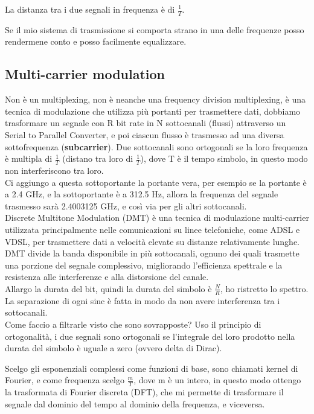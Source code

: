 La distanza tra i due segnali in frequenza è di $\frac 1 T$. 

Se il mio sistema di trasmissione si comporta strano in una delle frequenze posso rendermene conto e posso facilmente equalizzare.\\

\subsection{Multi-carrier modulation}
Non è un multiplexing, non è neanche una frequency division multiplexing, è una tecnica di modulazione che utilizza più portanti per trasmettere dati,
dobbiamo trasformare un segnale con R bit rate in N sottocanali (flussi) attraverso un Serial to Parallel Converter, e poi ciascun flusso
è trasmesso ad una diversa sottofrequenza (\textbf{subcarrier}).
Due sottocanali sono ortogonali se la loro frequenza è multipla di $\frac 1 T$ (distano tra loro di $\frac 1 T$), dove T è il tempo simbolo, 
in questo modo non interferiscono tra loro.\\

Ci aggiungo a questa sottoportante la portante vera, per esempio se la portante è a 2.4 GHz, e la sottoportante è a 312.5 Hz, allora 
la frequenza del segnale trasmesso sarà 2.4003125 GHz, e così via per gli altri sottocanali.\\

Discrete Multitone Modulation (DMT) è una tecnica di modulazione multi-carrier utilizzata principalmente nelle comunicazioni 
su linee telefoniche, come ADSL e VDSL, per trasmettere dati a velocità elevate su distanze relativamente lunghe. 
DMT divide la banda disponibile in più sottocanali, ognuno dei quali trasmette una porzione del segnale complessivo, 
migliorando l'efficienza spettrale e la resistenza alle interferenze e alla distorsione del canale.\\

Allargo la durata del bit, quindi la durata del simbolo è $\frac N R$, ho ristretto lo spettro. La separazione di ogni sinc 
è fatta in modo da non avere interferenza tra i sottocanali.\\

Come faccio a filtrarle visto che sono sovrapposte? Uso il principio di ortogonalità, i due segnali sono ortogonali se l'integrale del loro 
prodotto nella durata del simbolo è uguale a zero (ovvero delta di Dirac).

Scelgo gli esponenziali complessi come funzioni di base, sono chiamati kernel di Fourier, e come frequenza scelgo $\frac m T$, 
dove m è un intero, in questo modo ottengo la trasformata di Fourier discreta (DFT), che mi permette di trasformare il segnale dal dominio del 
tempo al dominio della frequenza, e viceversa.\\

